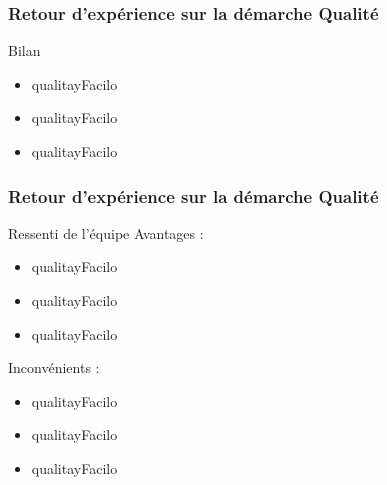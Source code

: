 \speaker{\Kafui}

\begin{frame}

\frametitle{Retour d'expérience sur la démarche Qualité}
	\begin{block}{Bilan}
		\begin{itemize}
			\item qualitayFacilo		
			\item qualitayFacilo
			\item qualitayFacilo
		\end{itemize}      
	\end{block}
\end{frame}

\begin{frame}

\frametitle{Retour d'expérience sur la démarche Qualité}
	\begin{block}{Ressenti de l'équipe}
		Avantages : 
		\begin{itemize}
			\item qualitayFacilo	
			\item qualitayFacilo
			\item qualitayFacilo
		\end{itemize}   
		Inconvénients :
		\begin{itemize}
			\item qualitayFacilo	
			\item qualitayFacilo
			\item qualitayFacilo			
		\end{itemize}   
	\end{block}
\end{frame}
